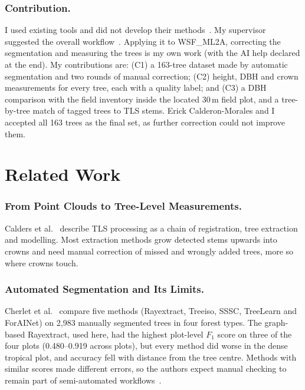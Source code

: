 \documentclass[runningheads]{llncs}
\begin{document}
\subsubsection{Contribution.}
I used existing tools and did not develop their methods~\cite{lowe2021,terryn2023}. My supervisor suggested the overall workflow~\cite{pipeline}. Applying it to WSF\_ML2A, correcting the segmentation and measuring the trees is my own work (with the AI help declared at the end). My contributions are: (C1) a 163-tree dataset made by automatic segmentation and two rounds of manual correction; (C2) height, DBH and crown measurements for every tree, each with a quality label; and (C3) a DBH comparison with the field inventory inside the located 30\,m field plot, and a tree-by-tree match of tagged trees to TLS stems. Erick Calderon-Morales and I accepted all 163 trees as the final set, as further correction could not improve them.

\section{Related Work}\label{sec:related}

\subsubsection{From Point Clouds to Tree-Level Measurements.}
Calders et al.~\cite{calders2020} describe TLS processing as a chain of registration, tree extraction and modelling. Most extraction methods grow detected stems upwards into crowns and need manual correction of missed and wrongly added trees, more so where crowns touch.

\subsubsection{Automated Segmentation and Its Limits.}
Cherlet et al.~\cite{cherlet2026} compare five methods (Rayextract, Treeiso, SSSC, TreeLearn and ForAINet) on 2,983 manually segmented trees in four forest types. The graph-based Rayextract, used here, had the highest plot-level $F_1$ score on three of the four plots (0.480--0.919 across plots), but every method did worse in the dense tropical plot, and accuracy fell with distance from the tree centre. Methods with similar scores made different errors, so the authors expect manual checking to remain part of semi-automated workflows~\cite{cherlet2026}.
\end{document}
